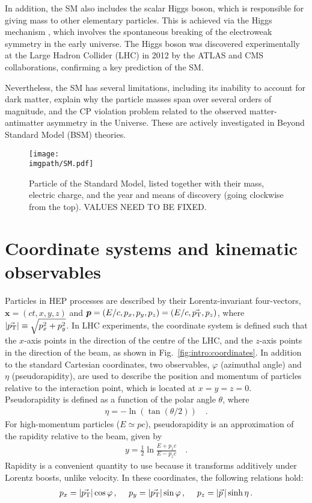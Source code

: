 In addition, the SM also includes the scalar Higgs boson, which is responsible for giving mass to other elementary particles. This is achieved via the Higgs mechanism \cite{higgsBrokenSymmetriesMasses1964, englertBrokenSymmetryMass1964}, which involves the spontaneous breaking of the electroweak symmetry in the early universe. The Higgs boson was discovered experimentally at the Large Hadron Collider (LHC) in 2012 by the ATLAS \cite{theatlascollaborationObservationNewParticle2012} and CMS \cite{thecmscollaborationObservationNewBoson2012} collaborations, confirming a key prediction of the SM.

Nevertheless, the SM has several limitations, including its inability to account for dark matter, explain why the particle masses span over several orders of magnitude, and the CP violation problem related to the observed matter-antimatter asymmetry in the Universe. These are actively investigated in Beyond Standard Model (BSM) theories.

\begin{figure}[H]
\texttt{[image: \\imgpath/SM.pdf]}
\caption{Particle of the Standard Model, listed together with their mass, electric charge, and the  year and means of discovery (going clockwise from the top). VALUES NEED TO BE FIXED.}
\end{figure}

\section{Coordinate systems and kinematic observables}

Particles in HEP processes are described by their Lorentz-invariant four-vectors, $\bm{x} = (ct, x, y, z)$ and $\bm{p} = (E/c, p_x, p_y, p_z) = (E/c, \vec{p_{\text{T}}} , p_z)$, where $|\vec{p_{\text{T}}}| \equiv \sqrt{p_x^2+p_y^2}$. In LHC experiments, the coordinate system is defined such that the $x$-axis points in the direction of the centre of the LHC, and the $z$-axis points in the direction of the beam, as shown in Fig.~\ref{fig:intro:coordinates}. In addition to the standard Cartesian coordinates, two observables, $\varphi$ (azimuthal angle) and $\eta$ (pseudorapidity), are used to describe the position and momentum of particles relative to the interaction point, which is located at $x = y = z = 0$. Pseudorapidity is defined as a function of the polar angle $\theta$, where 
\begin{align}
\eta = -\ln(\tan(\theta/2)) \quad .
\end{align}
For high-momentum particles ($E \simeq pc$), pseudorapidity is an approximation of the rapidity relative to the beam, given by 
\begin{align}
y = \frac{1}{2} \ln \frac{E + p_z c}{E - p_z c} \quad .
\end{align}
Rapidity is a convenient quantity to use because it transforms additively under Lorentz boosts, unlike velocity. In these coordinates, the following relations hold:
\begin{align}
p_x = |\vec{p_{\text{T}}}| \cos \varphi \, , \quad \
p_y = |\vec{p_{\text{T}}}| \sin \varphi \, , \quad \
p_z = |\vec{p} \,| \sinh \eta \, .
\end{align}

